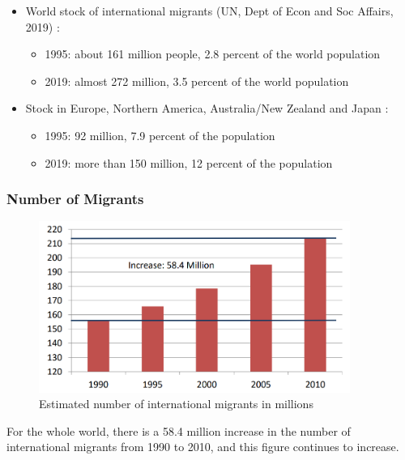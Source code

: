             \begin{itemize}
                \item World stock of international migrants (UN, Dept of Econ and Soc Affairs, 2019) :
                    \begin{itemize}
                         \item 1995: about 161 million people, 2.8 percent of the world population
                         \item 2019: almost 272 million, 3.5 percent of the world population
                    \end{itemize}
                \item Stock in Europe, Northern America, Australia/New Zealand and Japan :
                     \begin{itemize}
                         \item 1995: 92 million, 7.9 percent of the population
                         \item 2019: more than 150 million, 12 percent of the population
                    \end{itemize}
            \end{itemize}

        \subsubsection{Number of Migrants}
            
            \begin{figure}[H]
                        \centering
                        \includegraphics[width=4in]{images/ch11/1.png}
                        \caption{Estimated number of international migrants in millions}
                    \end{figure}
            For the whole world, there is a 58.4 million increase in the number of international migrants from 1990 to 2010, and this figure continues to increase.

